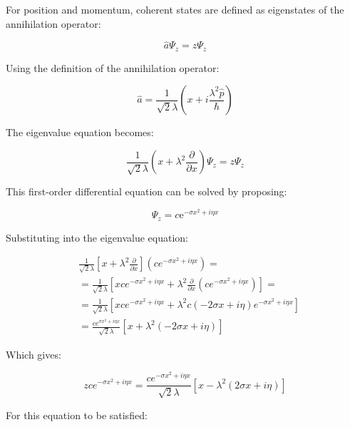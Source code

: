 \documentclass[10pt]{article}
\begin{document}
For position and momentum, coherent states are defined as eigenstates of the annihilation operator:

\begin{equation*}
\hat{a} \Psi_{z}=z \Psi_{z} \tag{7.46}
\end{equation*}

Using the definition of the annihilation operator:

\begin{equation*}
\hat{a}=\frac{1}{\sqrt{2} \lambda}\left(x+i \frac{\lambda^{2} \hat{p}}{\hbar}\right) \tag{7.47}
\end{equation*}

The eigenvalue equation becomes:

\begin{equation*}
\frac{1}{\sqrt{2} \lambda}\left(x+\lambda^{2} \frac{\partial}{\partial x}\right) \Psi_{z}=z \Psi_{z} \tag{7.48}
\end{equation*}

This first-order differential equation can be solved by proposing:

\begin{equation*}
\Psi_{z}=c \mathrm{e}^{-\sigma x^{2}+i \eta x} \tag{7.49}
\end{equation*}

Substituting into the eigenvalue equation:

\begin{align*}
& \frac{1}{\sqrt{2} \lambda}\left[x+\lambda^{2} \frac{\partial}{\partial x}\right]\left(c e^{-\sigma x^{2}+i \eta x}\right)= \\
& =\frac{1}{\sqrt{2} \lambda}\left[x c e^{-\sigma x^{2}+i \eta x}+\lambda^{2} \frac{\partial}{\partial x}\left(c e^{-\sigma x^{2}+i \eta x}\right)\right]= \\
& =\frac{1}{\sqrt{2} \lambda}\left[x c e^{-\sigma x^{2}+i \eta x}+\lambda^{2} c(-2 \sigma x+i \eta) e^{-\sigma x^{2}+i \eta x}\right]  \tag{7.50}\\
& =\frac{c e^{\sigma x^{2}+i \eta x}}{\sqrt{2} \lambda}\left[x+\lambda^{2}(-2 \sigma x+i \eta)\right]
\end{align*}

Which gives:

\begin{equation*}
z c e^{-\sigma x^{2}+i \eta x}=\frac{c e^{-\sigma x^{2}+i \eta x}}{\sqrt{2} \lambda}\left[x-\lambda^{2}(2 \sigma x+i \eta)\right] \tag{7.51}
\end{equation*}

For this equation to be satisfied:
\end{document}
